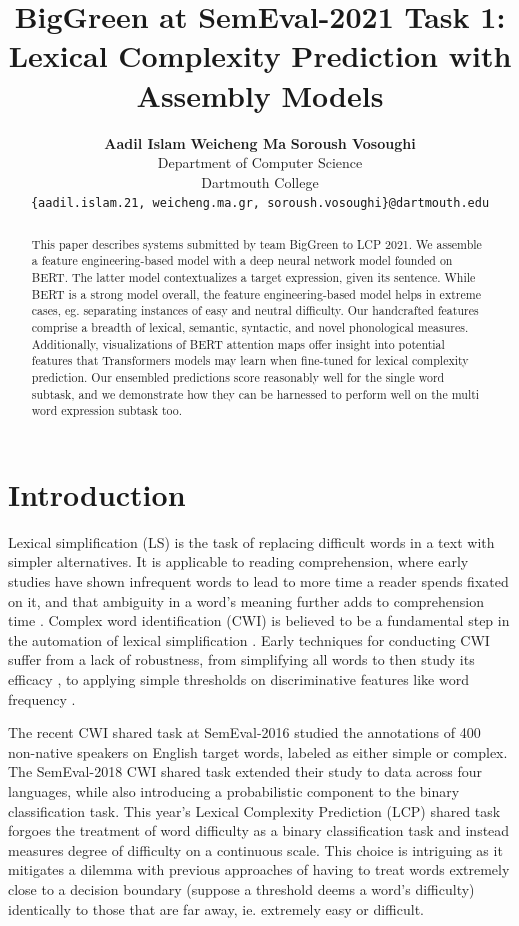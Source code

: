 \documentclass[11pt,a4paper]{article}
\title{BigGreen at SemEval-2021 Task 1: \\
Lexical Complexity Prediction with Assembly Models}
\author{
  \textbf{Aadil Islam}\normalfont{,} \textbf{Weicheng Ma}\normalfont{, and} \textbf{Soroush Vosoughi}\\
  Department of Computer Science\\
  Dartmouth College\\
  \texttt{\{aadil.islam.21, weicheng.ma.gr, soroush.vosoughi\}@dartmouth.edu}
}
\date{}
\begin{document}
\maketitle

\begin{abstract}
  This paper describes systems submitted by team BigGreen to LCP 2021. We assemble a feature engineering-based model with a deep neural network model founded on BERT. The latter model contextualizes a target expression, given its sentence. While BERT is a strong model overall, the feature engineering-based model helps in extreme cases, eg. separating instances of easy and neutral difficulty. Our handcrafted features comprise a breadth of lexical, semantic, syntactic, and novel phonological measures. Additionally, visualizations of BERT attention maps offer insight into potential features that Transformers models may learn when fine-tuned for lexical complexity prediction. Our ensembled predictions score reasonably well for the single word subtask, and we demonstrate how they can be harnessed to perform well on the multi word expression subtask too.
\end{abstract}

\section{Introduction}

Lexical simplification (LS) is the task of replacing difficult words in a text with simpler alternatives. It is applicable to reading comprehension, where early studies have shown infrequent words to lead to more time a reader spends fixated on it, and that ambiguity in a word's meaning further adds to comprehension time \citep{raynerd86}. Complex word identification (CWI) is believed to be a fundamental step in the automation of lexical simplification \citep{shardlow2014open}. Early techniques for conducting CWI suffer from a lack of robustness, from simplifying all words to then study its efficacy \citep{devlintait}, to applying simple thresholds on discriminative features like word frequency \citep{10.1007/11573067_19}. 

The recent CWI shared task at SemEval-2016 \citep{paetzoldspecia:2016:SemEval1} studied the annotations of 400 non-native speakers on English target words, labeled as either simple or complex. The SemEval-2018 CWI shared task \citep{stajner-EtAl:2018:BEA} extended their study to data across four languages, while also introducing a probabilistic component to the binary classification task. This year's Lexical Complexity Prediction (LCP) shared task \citep{shardlow2020complex} forgoes the treatment of word difficulty as a binary classification task \citep{paetzoldspecia:2016:SemEval1, stajner-EtAl:2018:BEA} and instead measures degree of difficulty on a continuous scale. This choice is intriguing as it mitigates a dilemma with previous approaches of having to treat words extremely close to a decision boundary (suppose a threshold deems a word's difficulty) identically to those that are far away, ie. extremely easy or difficult.
\end{document}
